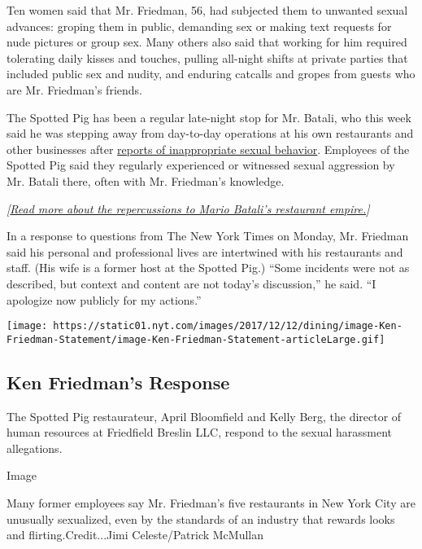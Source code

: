 Ten women said that Mr. Friedman, 56, had subjected them to unwanted
sexual advances: groping them in public, demanding sex or making text
requests for nude pictures or group sex. Many others also said that
working for him required tolerating daily kisses and touches, pulling
all-night shifts at private parties that included public sex and nudity,
and enduring catcalls and gropes from guests who are Mr. Friedman's
friends.

The Spotted Pig has been a regular late-night stop for Mr. Batali, who
this week said he was stepping away from day-to-day operations at his
own restaurants and other businesses after
\href{https://www.nytimes.com/2017/12/11/dining/mario-batali-sexual-misconduct.html}{reports
of inappropriate sexual behavior}. Employees of the Spotted Pig said
they regularly experienced or witnessed sexual aggression by Mr. Batali
there, often with Mr. Friedman's knowledge.

\emph{{[}}\href{https://www.nytimes.com/2019/03/06/dining/mario-batali-bastianich-restaurants.html}{\emph{Read
more about the repercussions to Mario Batali's restaurant
empire.}}\emph{{]}}

In a response to questions from The New York Times on Monday, Mr.
Friedman said his personal and professional lives are intertwined with
his restaurants and staff. (His wife is a former host at the Spotted
Pig.) ``Some incidents were not as described, but context and content
are not today's discussion,'' he said. ``I apologize now publicly for my
actions.''

\href{https://www.nytimes.com/interactive/2017/12/12/dining/document-Ken-Friedman-Statement.html}{}

\texttt{[image: https://static01.nyt.com/images/2017/12/12/dining/image-Ken-Friedman-Statement/image-Ken-Friedman-Statement-articleLarge.gif]}

\hypertarget{ken-friedmans-response}{%
\subsection{Ken Friedman's Response}\label{ken-friedmans-response}}

The Spotted Pig restaurateur, April Bloomfield and Kelly Berg, the
director of human resources at Friedfield Breslin LLC, respond to the
sexual harassment allegations.

Image

Many former employees say Mr. Friedman's five restaurants in New York
City are unusually sexualized, even by the standards of an industry that
rewards looks and flirting.Credit...Jimi Celeste/Patrick McMullan

